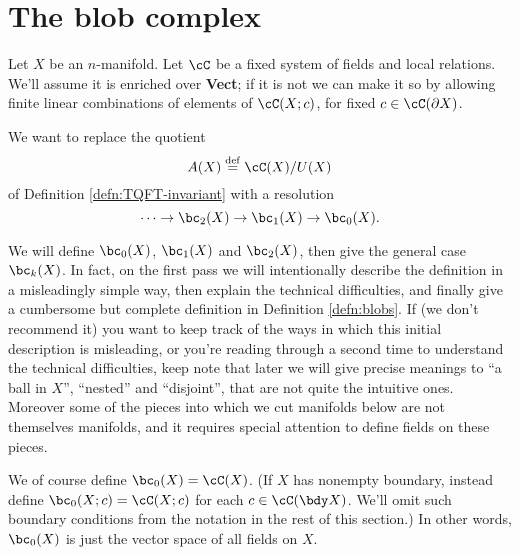 
\section{The blob complex}
\label{sec:blob-definition}

Let $X$ be an $n$-manifold.
Let $\cC$ be a fixed system of fields and local relations.
We'll assume it is enriched over \textbf{Vect}; 
if it is not we can make it so by allowing finite
linear combinations of elements of $\cC(X; c)$, for fixed $c\in \cC(\bd X)$.


We want to replace the quotient
\[
	A(X) \deq \lf(X) / U(X)
\]
of Definition \ref{defn:TQFT-invariant} with a resolution
\[
	\cdots \to \bc_2(X) \to \bc_1(X) \to \bc_0(X) .
\]

We will define $\bc_0(X)$, $\bc_1(X)$ and $\bc_2(X)$, then give the general case $\bc_k(X)$. 
In fact, on the first pass we will intentionally describe the definition in a misleadingly simple way, 
then explain the technical difficulties, and finally give a cumbersome but complete definition in 
Definition \ref{defn:blobs}. 
If (we don't recommend it) you want to keep track of the ways in which 
this initial description is misleading, or you're reading through a second time to understand the 
technical difficulties, keep note that later we will give precise meanings to ``a ball in $X$'', 
``nested'' and ``disjoint'', that are not quite the intuitive ones. 
Moreover some of the pieces 
into which we cut manifolds below are not themselves manifolds, and it requires special attention 
to define fields on these pieces.

We of course define $\bc_0(X) = \lf(X)$.
(If $X$ has nonempty boundary, instead define $\bc_0(X; c) = \lf(X; c)$ for each $c \in \lf(\bdy X)$.
We'll omit such boundary conditions from the notation in the rest of this section.)
In other words, $\bc_0(X)$ is just the vector space of all fields on $X$.

